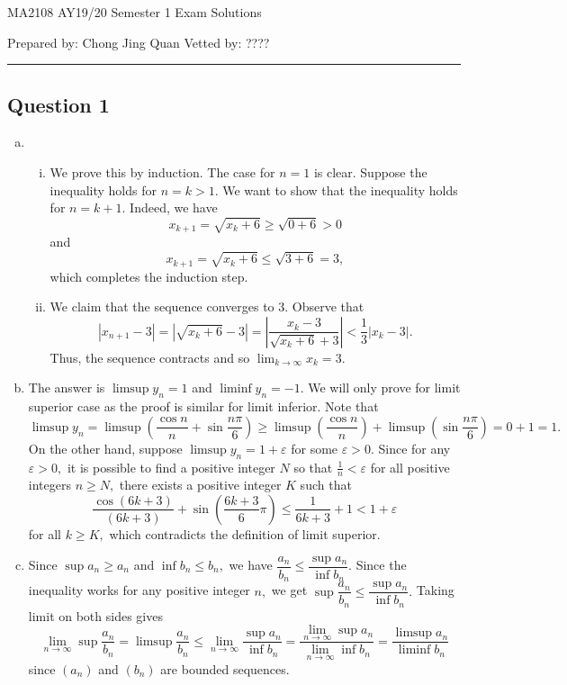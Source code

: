 \documentclass{article}
\begin{document}
    {\LARGE{MA2108 AY19/20 Semester 1 Exam Solutions}}
    \vspace{0.2in}
    
    Prepared by: Chong Jing Quan \hfill Vetted by: ????
    
    \par\noindent\rule{\textwidth}{0.4pt}
\subsection*{Question 1}
\begin{enumerate}[(a)]
    \item \begin{enumerate}[(i)]
        \item We prove this by induction. The case for $n=1$ is clear. Suppose the inequality holds for $n=k>1.$ We want to show that the inequality holds for $n=k+1.$ Indeed, we have $$x_{k+1}=\sqrt{x_k+6}\geq\sqrt{0+6}>0$$ and $$x_{k+1}=\sqrt{x_k+6}\leq\sqrt{3+6}=3,$$ which completes the induction step.
        \item We claim that the sequence converges to 3. Observe that $$|x_{n+1}-3|=|\sqrt{x_k+6}-3|=\left|\frac{x_k-3}{\sqrt{x_k+6}+3}\right|<\frac{1}{3}|x_k-3|.$$ Thus, the sequence contracts and so $\displaystyle\lim_{k\to\infty}x_k=3.$
    \end{enumerate}
    \item The answer is $\limsup y_n=1$ and $\liminf y_n=-1.$ We will only prove for limit superior case as the proof is similar for limit inferior. Note that
    $$\limsup y_n=\limsup \left(\frac{\cos n}{n}+\sin\frac{n\pi}{6}\right)\geq\limsup\left(\frac{\cos n}{n}\right)+\limsup\left(\sin\frac{n\pi}{6}\right)=0+1=1.$$
    On the other hand, suppose $\limsup y_n=1+\varepsilon$ for some $\varepsilon>0.$ Since for any $\varepsilon>0,$ it is possible to find a positive integer $N$ so that $\frac{1}{n}<\varepsilon$ for all positive integers $n\geq N,$ there exists a positive integer $K$ such that $$\frac{\cos (6k+3)}{(6k+3)}+\sin\left(\frac{6k+3}{6}\pi\right)\leq\frac{1}{6k+3}+1<1+\varepsilon$$ for all $k\geq K,$ which contradicts the definition of limit superior.
    \item Since $\sup a_n\geq a_n$ and $\inf b_n\leq b_n,$ we have $\dfrac{a_n}{b_n}\leq \dfrac{\sup a_n}{\inf b_n}.$ Since the inequality works for any positive integer $n,$ we get $\sup\dfrac{a_n}{b_n}\leq \dfrac{\sup a_n}{\inf b_n}.$ Taking limit on both sides gives $$\lim_{n\to\infty}\sup\frac{a_n}{b_n}=\limsup\frac{a_n}{b_n}\leq \lim_{n\to\infty}\dfrac{\sup a_n}{\inf b_n}=\dfrac{\lim_{n\to\infty}\sup a_n}{\lim_{n\to\infty}\inf b_n}=\frac{\limsup a_n}{\liminf b_n}$$ since $(a_n)$ and $(b_n)$ are bounded sequences.
\end{enumerate}
\end{document}
